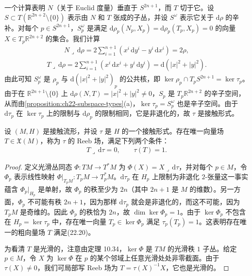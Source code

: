 \documentclass[../../main.tex]{subfiles}
\begin{document}
\begin{example}[接触形式]
\begin{enumerate}[(a)]
一个计算表明 $N$（关于 Euclid 度量）垂直于 $S^{2n+1}$，而 $T$ 切于它。设 $S\subset T(\mathbb{R}^{2n+2}\setminus\{0\})$ 表示由 $N$ 和 $T$ 张成的子丛，并设 $S^\omega$ 表示它关于 $\mathrm{d}\rho$ 的辛补。对每个 $p\in S^{2n+1}$，$S^\omega_p$ 是满足 $\mathrm{d}\rho_p(N_p,X_p)=\mathrm{d}\rho_p(T_p,X_p)=0$ 的向量 $X\in T_p\mathbb{R}^{2n+2}$ 的集合。我们计算
\begin{align*}
N\lrcorner\,\mathrm{d}\rho=2\sum_{i=1}^{n+1}(x^i\,\mathrm{d}y^i-y^i\,\mathrm{d}x^i)=2\rho,
\end{align*}
\begin{align*}
T\lrcorner\,\mathrm{d}\rho=2\sum_{i=1}^{n+1}(x^i\,\mathrm{d}x^i+y^i\,\mathrm{d}y^i)=\mathrm{d}(|x|^2+|y|^2).
\end{align*}
由此可知 $S^\omega_p$ 是 $\rho_p$ 与 $\mathrm{d}(|x|^2+|y|^2)_p$ 的公共核，即 $\ker\rho_p\cap T_pS^{2n+1}=\ker\tau_p$。由于在 $\mathbb{R}^{2n+1}\setminus\{0\}$ 上 $\mathrm{d}\rho(N,T)=|x|^2+|y|^2\neq0$，$S_p$ 是 $T_p\mathbb{R}^{2n+2}$ 的辛子空间，从而由\cref{proposition:ch22-subspace-types}(a)，$\ker\tau_p=S^\omega_p$ 也是辛子空间。由于 $\mathrm{d}\tau_p$ 在 $\ker\tau_p$ 上的限制与 $\mathrm{d}\rho_p$ 的限制相同，它是非退化的，故 $\tau$ 是接触形式。
\end{enumerate}
\end{example}

\begin{theorem}[Reeb 场]\label{theorem:ch22-reeb}
设 $(M,H)$ 是接触流形，并设 $\tau$ 是 $H$ 的一个接触形式。存在唯一向量场 $T\in\mathfrak X(M)$，称为 $\tau$ 的 Reeb 场，满足下列两个条件：
\begin{align}
T\lrcorner\,\mathrm{d}\tau=0,\qquad \tau(T)=1.
\end{align}
\end{theorem}

\begin{proof}
定义光滑丛同态 $\Phi:TM\to T^*M$ 为 $\Phi(X)=X\lrcorner\,\mathrm{d}\tau$，并对每个 $p\in M$，令 $\Phi_p$ 表示线性映射 $\Phi|_{T_pM}:T_pM\to T^*_pM$。$\mathrm{d}\tau_p$ 在 $H_p$ 上限制为非退化 $2$-张量这一事实蕴含 $\Phi_p|_{H_p}$ 是单射，故 $\Phi_p$ 的秩至少为 $2n$（其中 $2n+1$ 是 $M$ 的维数）。另一方面，$\Phi_p$ 不可能有秩 $2n+1$，因为那样 $\mathrm{d}\tau_p$ 就会是非退化的，而这不可能，因为 $T_pM$ 是奇维的。因此 $\Phi_p$ 的秩恰为 $2n$，故 $\dim\ker\Phi_p=1$。由于 $\ker\Phi_p$ 不包含在 $H_p=\ker\tau_p$ 中，存在唯一向量 $T_p\in\ker\Phi_p$ 满足 $\tau_p(T_p)=1$。这表明存在唯一的粗向量场 $T$ 满足(22.20)。

为看清 $T$ 是光滑的，注意由定理 10.34，$\ker\Phi$ 是 $TM$ 的光滑秩 $1$ 子丛。给定 $p\in M$，令 $X$ 为 $\ker\Phi$ 在 $p$ 的某个邻域上任意光滑处处非零截面。由于 $\tau(X)\neq0$，我们可局部写 Reeb 场为 $T=\tau(X)^{-1}X$，它也是光滑的。
\end{proof}
\end{document}
